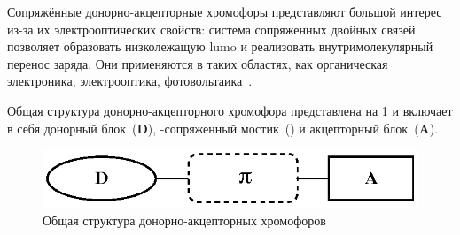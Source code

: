 




Сопряжённые донорно-акцепторные хромофоры представляют большой интерес из-за их электрооптических свойств: система сопряженных двойных связей позволяет образовать низколежащую \ac{lumo} и реализовать внутримолекулярный перенос заряда.
Они применяются в таких областях, как органическая электроника, электрооптика, фотовольтаика~\cite{Bures2014a}.

Общая структура донорно-акцепторного хромофора представлена на \ref{fig:D-p-A_chromophores} и включает в себя донорный блок~(\textbf{D}), \chempi-сопряженный мостик~({\Large\chempi}) и акцепторный блок~(\textbf{A}).

\begin{figure}[h!]
    \centering
    \includegraphics{sections/literature/img/D-p-A_chromophores.eps}
    \caption{Общая структура донорно-акцепторных хромофоров}
    \label{fig:D-p-A_chromophores}
\end{figure}

